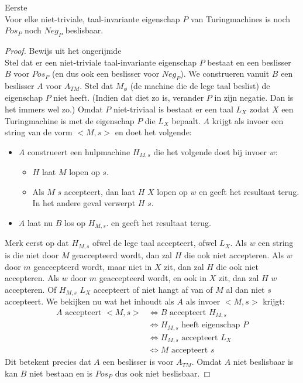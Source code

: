 \documentclass[main.tex]{subfiles}
\begin{document}
\begin{st}
  \label{st:eerste-stelling-van-rice}
  Eerste \\
  Voor elke niet-triviale, taal-invariante eigenschap $P$ van Turingmachines is noch $Pos_{P}$ noch $Neg_{P}$ beslisbaar.

  \begin{proof}
    Bewijs uit het ongerijmde\\
    Stel dat er een niet-triviale taal-invariante eigenschap $P$ bestaat en een beslisser $B$ voor $Pos_{P}$ (en dus ook een beslisser voor $Neg_{P}$).
    We construeren vanuit $B$ een beslisser $A$ voor $A_{TM}$.
    Stel dat $M_{\phi}$ (de machine die de lege taal beslist) de eigenschap $P$ niet heeft.
    (Indien dat diet zo is, verander $P$ in zijn negatie. Dan is het immers wel zo.)
    Omdat $P$ niet-triviaal is bestaat er een taal $L_{X}$ zodat $X$ een Turingmachine is met de eigenschap $P$ die $L_{X}$ bepaalt.
    $A$ krijgt als invoer een string van de vorm $<M,s>$ en doet het volgende:
    \begin{itemize}
    \item $A$ construeert een hulpmachine $H_{M,s}$ die het volgende doet bij invoer $w$:
      \begin{itemize}
      \item $H$ laat $M$ lopen op $s$.
      \item Als $M$ $s$ accepteert, dan laat $H$ $X$ lopen op $w$ en geeft het resultaat terug.
        In het andere geval verwerpt $H$ $s$.
      \end{itemize}
    \item $A$ laat nu $B$ los op $H_{M,s}$. en geeft het resultaat terug.
    \end{itemize}
    Merk eerst op dat $H_{M,s}$ ofwel de lege taal accepteert, ofwel $L_{X}$.
    Als $w$ een string is die niet door $M$ geaccepteerd wordt, dan zal $H$ die ook niet accepteren.
    Als $w$ door $m$ geaccepteerd wordt, maar niet in $X$ zit, dan zal $H$ die ook niet accepteren.
    Als $w$ door $m$ geaccepteerd wordt, en ook in $X$ zit, dan zal $H$ $w$ accepteren.
    Of $H_{M,s}$ $L_{X}$ accepteert of niet hangt af van of $M$ al dan niet $s$ accepteert.
    We bekijken nu wat het inhoudt als $A$ als invoer $<M,s>$ krijgt:
    \[
    \begin{array}{rl}
      A \text{ accepteert } <M,s> &\Leftrightarrow B \text{ accepteert } H_{M,s}\\
      &\Leftrightarrow H_{M,s} \text{ heeft eigenschap } P\\ 
      &\Leftrightarrow H_{M,s} \text{ accepteert } L_{X}\\
      &\Leftrightarrow M \text{ accepteert } s
    \end{array}
    \]
    Dit betekent precies dat $A$ een beslisser is voor $A_{TM}$.
    Omdat $A$ niet beslisbaar is kan $B$ niet bestaan en is $Pos_{P}$ dus ook niet beslisbaar.
  \end{proof}
\end{st}
\end{document}
